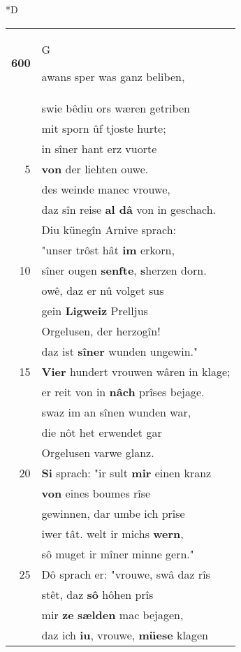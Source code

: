 \documentclass[8pt,a4paper,notitlepage]{article}
\begin{document}
\begin{table}[ht]
\begin{minipage}[t]{0.5\linewidth}
\small
\begin{center}*D
\end{center}
\begin{tabular}{rl}
\textbf{600} & \begin{large}G\end{large}awans sper was ganz beliben,\\ 
 & swie bêdiu ors wæren getriben\\ 
 & mit sporn ûf tjoste hurte;\\ 
 & in sîner hant erz vuorte\\ 
5 & \textbf{von} der liehten ouwe.\\ 
 & des weinde manec vrouwe,\\ 
 & daz sîn reise \textbf{al dâ} von in geschach.\\ 
 & Diu künegîn Arnive sprach:\\ 
 & "unser trôst hât \textbf{im} erkorn,\\ 
10 & sîner ougen \textbf{senfte}, \textbf{s}herzen dorn.\\ 
 & owê, daz er nû volget sus\\ 
 & gein \textbf{Ligweiz} Prelljus\\ 
 & Orgelusen, der herzogîn!\\ 
 & daz ist \textbf{sîner} wunden ungewin."\\ 
15 & \textbf{Vier} hundert vrouwen wâren in klage;\\ 
 & er reit von in \textbf{nâch} prîses bejage.\\ 
 & swaz im an sînen wunden war,\\ 
 & die nôt het erwendet gar\\ 
 & Orgelusen varwe glanz.\\ 
20 & \textbf{Si} sprach: "ir sult \textbf{mir} einen kranz\\ 
 & \textbf{von} eines boumes rîse\\ 
 & gewinnen, dar umbe ich prîse\\ 
 & iwer tât. welt ir michs \textbf{wern},\\ 
 & sô muget ir mîner minne gern."\\ 
25 & Dô sprach er: "vrouwe, swâ daz rîs\\ 
 & stêt, daz \textbf{sô} hôhen prîs\\ 
 & mir \textbf{ze} \textbf{sælden} mac bejagen,\\ 
 & daz ich \textbf{iu}, vrouwe, \textbf{müese} klagen\\ 

\end{tabular}
\end{minipage}
\end{table}
\end{document}
